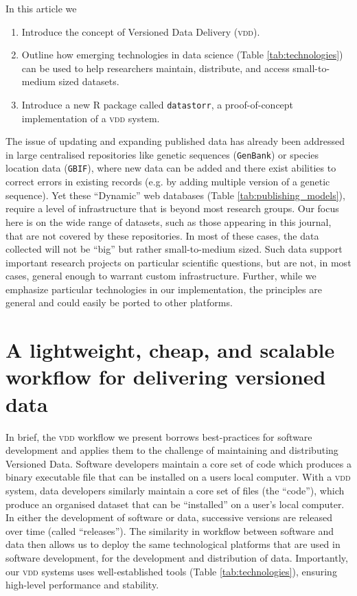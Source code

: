 \documentclass[a4paper,11pt]{article}
\begin{document}
In this article we
\begin{enumerate}
  \item Introduce the concept of Versioned Data Delivery (\textsc{vdd}).
  \item Outline how emerging technologies in data science (Table \ref{tab:technologies}) can be used to help researchers maintain, distribute, and access small-to-medium sized datasets.
  \item Introduce a new \textsc{R} package called \texttt{datastorr}, a proof-of-concept implementation of a \textsc{vdd} system.
\end{enumerate}
The issue of updating and expanding published data has already been addressed in large centralised repositories like genetic sequences (\texttt{GenBank}) or species location data (\texttt{GBIF}), where new data can be added and there exist abilities to correct errors in existing records (e.g. by adding multiple version of a genetic sequence). Yet these ``Dynamic'' web databases (Table \ref{tab:publishing_models}), require a level of infrastructure that is beyond most research groups. Our focus here is on the wide range of datasets, such as those appearing in this journal, that are not covered by these repositories. In most of these cases, the data collected will not be ``big'' but rather small-to-medium sized. Such data support important research projects on particular scientific questions, but are not, in most cases, general enough to warrant custom infrastructure. Further, while we emphasize particular technologies in our implementation, the principles are general and could easily be ported to other platforms.

\section{A lightweight, cheap, and scalable workflow for delivering versioned data}

In brief, the \textsc{vdd} workflow we present borrows best-practices for software development \citep{Perez-Riverol-2016} and applies them to the challenge of maintaining and distributing Versioned Data. Software developers maintain a core set of code which produces a binary executable file that can be installed on a users local computer. With a \textsc{vdd} system, data developers similarly maintain a core set of files (the ``code''), which produce an organised dataset that can be ``installed'' on a user's local computer. In either the development of software or data, successive versions are released over time (called ``releases''). The similarity in workflow between software and data then allows us to deploy the same technological platforms that are used in software development, for the development and distribution of data. Importantly, our \textsc{vdd} systems uses well-established tools (Table \ref{tab:technologies}), ensuring high-level performance and stability.
\end{document}
